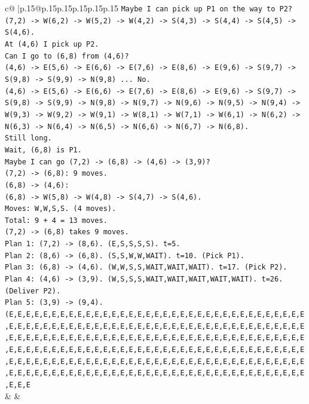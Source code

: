 \documentclass{article}
\begin{document}
{\begin{supertabular}{c@{$\;$}|p{.15\linewidth}@{}p{.15\linewidth}p{.15\linewidth}p{.15\linewidth}p{.15\linewidth}p{.15\linewidth}}
{{{\texttt{Maybe I can pick up P1 on the way to P2?} \\
\texttt{(7,2) {-}> W(6,2) {-}> W(5,2) {-}> W(4,2) {-}> S(4,3) {-}> S(4,4) {-}> S(4,5) {-}> S(4,6).} \\
\texttt{At (4,6) I pick up P2.} \\
\texttt{Can I go to (6,8) from (4,6)?} \\
\texttt{(4,6) {-}> E(5,6) {-}> E(6,6) {-}> E(7,6) {-}> E(8,6) {-}> E(9,6) {-}> S(9,7) {-}> S(9,8) {-}> S(9,9) {-}> N(9,8) ... No.} \\
\texttt{(4,6) {-}> E(5,6) {-}> E(6,6) {-}> E(7,6) {-}> E(8,6) {-}> E(9,6) {-}> S(9,7) {-}> S(9,8) {-}> S(9,9) {-}> N(9,8) {-}> N(9,7) {-}> N(9,6) {-}> N(9,5) {-}> N(9,4) {-}> W(9,3) {-}> W(9,2) {-}> W(9,1) {-}> W(8,1) {-}> W(7,1) {-}> W(6,1) {-}> N(6,2) {-}> N(6,3) {-}> N(6,4) {-}> N(6,5) {-}> N(6,6) {-}> N(6,7) {-}> N(6,8).} \\
\texttt{Still long.} \\
\texttt{Wait, (6,8) is P1.} \\
\texttt{Maybe I can go (7,2) {-}> (6,8) {-}> (4,6) {-}> (3,9)?} \\
\texttt{(7,2) {-}> (6,8): 9 moves.} \\
\texttt{(6,8) {-}> (4,6):} \\
\texttt{(6,8) {-}> W(5,8) {-}> W(4,8) {-}> S(4,7) {-}> S(4,6).} \\
\texttt{Moves: W,W,S,S. (4 moves).} \\
\texttt{Total: 9 + 4 = 13 moves.} \\
\texttt{(7,2) {-}> (6,8) takes 9 moves.} \\
\texttt{Plan 1: (7,2) {-}> (8,6). (E,S,S,S,S). t=5.} \\
\texttt{Plan 2: (8,6) {-}> (6,8). (S,S,W,W,WAIT). t=10. (Pick P1).} \\
\texttt{Plan 3: (6,8) {-}> (4,6). (W,W,S,S,WAIT,WAIT,WAIT). t=17. (Pick P2).} \\
\texttt{Plan 4: (4,6) {-}> (3,9). (W,S,S,S,WAIT,WAIT,WAIT,WAIT,WAIT). t=26. (Deliver P2).} \\
\texttt{Plan 5: (3,9) {-}> (9,4). (E,E,E,E,E,E,E,E,E,E,E,E,E,E,E,E,E,E,E,E,E,E,E,E,E,E,E,E,E,E,E,E,E,E,E,E,E,E,E,E,E,E,E,E,E,E,E,E,E,E,E,E,E,E,E,E,E,E,E,E,E,E,E,E,E,E,E,E,E,E,E,E,E,E,E,E,E,E,E,E,E,E,E,E,E,E,E,E,E,E,E,E,E,E,E,E,E,E,E,E,E,E,E,E,E,E,E,E,E,E,E,E,E,E,E,E,E,E,E,E,E,E,E,E,E,E,E,E,E,E,E,E,E,E,E,E,E,E,E,E,E,E,E,E,E,E,E,E,E,E,E,E,E,E,E,E,E,E,E,E,E,E,E,E,E,E,E,E,E,E,E,E,E,E,E,E,E,E,E,E,E,E,E,E,E,E,E,E,E,E,E,E,E,E,E,E,E,E,E,E,E,E,E,E,E,E,E,E,E,E,E,E,E} \\
            }
        }
    }
    & & \\ \\


\end{supertabular}}
\end{document}
